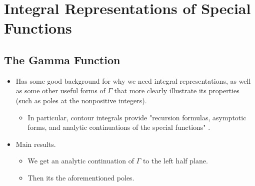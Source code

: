 \documentclass[../finalProject.tex]{subfiles}
\begin{document}
\section{Integral Representations of Special Functions}
\subsection{The Gamma Function}
\begin{itemize}
    \item {}Has some good background for why we need integral representations, as well as some other useful forms of $\Gamma$ that more clearly illustrate its properties (such as poles at the nonpositive integers).
    \begin{itemize}
        \item In particular, contour integrals provide "recursion formulas, asymptotic forms, and analytic continuations of the special functions" \parencite[171]{bib:Seaborn}.
    \end{itemize}
    \item Main results.
    \begin{itemize}
        \item We get an analytic continuation of $\Gamma$ to the left half plane.
        \item Then its the aforementioned poles.
    \end{itemize}
\end{itemize}


\setcounter{subsection}{3}
\end{document}
